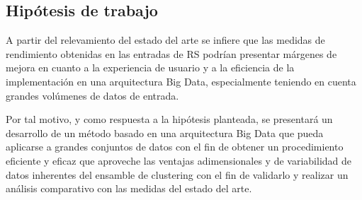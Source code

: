 \subsection{Hipótesis de trabajo}
A partir del relevamiento del estado del arte se infiere que las medidas de rendimiento obtenidas en las entradas de RS podrían presentar márgenes de mejora en cuanto a la experiencia de usuario y a la eficiencia de la implementación en una arquitectura Big Data, especialmente teniendo en cuenta grandes volúmenes de datos de entrada.

\bigskip Por tal motivo, y como respuesta a la hipótesis planteada, se presentará un desarrollo de un método basado en una arquitectura Big Data que pueda aplicarse a grandes conjuntos de datos con el fin de obtener un procedimiento eficiente y eficaz que aproveche las ventajas adimensionales y de variabilidad de datos inherentes del ensamble de clustering con el fin de validarlo y realizar un análisis comparativo con las medidas del estado del arte.